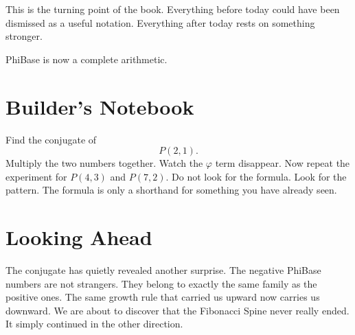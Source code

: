 This is the turning point of the book. Everything before today could have been dismissed as a useful notation. Everything after today rests on something stronger.

PhiBase is now a complete arithmetic.

\section*{Builder's Notebook}

Find the conjugate of
\[
P(2,1).
\]
Multiply the two numbers together. Watch the \(\varphi\) term disappear. Now repeat the experiment for \(P(4,3)\) and \(P(7,2)\). Do not look for the formula. Look for the pattern. The formula is only a shorthand for something you have already seen.

\section*{Looking Ahead}

The conjugate has quietly revealed another surprise. The negative PhiBase numbers are not strangers. They belong to exactly the same family as the positive ones. The same growth rule that carried us upward now carries us downward. We are about to discover that the Fibonacci Spine never really ended. It simply continued in the other direction.
